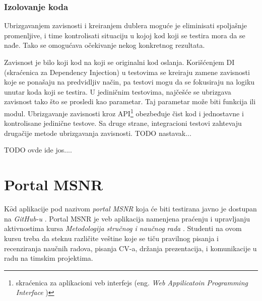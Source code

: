 \documentclass[12pt,oneside]{memoir}
\begin{document}
\subsection{Izolovanje koda} 
\par Ubrizgavanjem zavisnosti i kreiranjem dublera moguće je eliminisati spoljašnje promenljive, i time kontrolisati situaciju u kojoj k${o}$d koji se testira mora da se nađe. Tako se omogućava očekivanje nekog konkretnog rezultata. 
\par Zavisnost je bilo koji kod na koji se originalni kod oslanja. Korišćenjem DI (skraćenica za Dependency Injection) u testovima se kreiraju zamene zavisnosti koje se ponašaju na predvidljiv način, pa testovi mogu da se fokusiraju na logiku unutar koda koji se testira. U jediničnim testovima, najčešće se ubrizgava zavisnost tako što se prosledi kao parametar. Taj parametar može biti funkcija ili modul. Ubrizgavanje zavisnosti kroz API\footnote{skraćenica za aplikacioni veb interfejs (eng. \textit{Web Appilicatoin
Programming Interface} )} obezbeđuje čist kod i jednostavne i kontrolisane jedinične testove. Sa druge strane, integracioni testovi zahtevaju drugačije metode ubrizgavanja zavisnosti. TODO nastavak...


\par TODO ovde ide jos....

\chapter{Portal MSNR}
\label{chp:msnr}

\par K$\hat{o}$d aplikacije pod nazivom \emph{portal MSNR} koja će biti testirana javno je dostupan na \emph{GitHub-u} \cite{msnr-portal}. Portal MSNR je veb aplikacija namenjena praćenju i upravljanju aktivnostima kursa \emph{Metodologija stručnog i naučnog rada} \cite{rad}. Studenti na ovom kursu treba da steknu različite veštine koje se tiču pravilnog pisanja i recenziranja naučnih radova, pisanja CV-a, držanja prezentacija, i komunikacije u radu na timskim projektima. 
\end{document}
